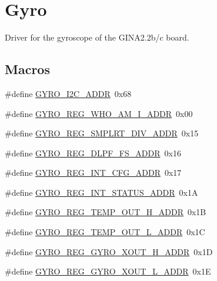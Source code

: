 \hypertarget{group___gyro}{}\section{Gyro}
\label{group___gyro}


Driver for the gyroscope of the G\+I\+N\+A2.\+2b/c board.  


\subsection*{Macros}
\begin{DoxyCompactItemize}
\item 
\#define \hyperlink{group___gyro_gad8d92e4df793131fb80295ae8ac32ebd}{G\+Y\+R\+O\+\_\+\+I2\+C\+\_\+\+A\+D\+DR}~0x68
\item 
\#define \hyperlink{group___gyro_gad4f28548805a04b3350f1812de473db9}{G\+Y\+R\+O\+\_\+\+R\+E\+G\+\_\+\+W\+H\+O\+\_\+\+A\+M\+\_\+\+I\+\_\+\+A\+D\+DR}~0x00
\item 
\#define \hyperlink{group___gyro_gae50e78b4f45f94a3d4e467f01f72fb62}{G\+Y\+R\+O\+\_\+\+R\+E\+G\+\_\+\+S\+M\+P\+L\+R\+T\+\_\+\+D\+I\+V\+\_\+\+A\+D\+DR}~0x15
\item 
\#define \hyperlink{group___gyro_gab4072c41c2a2593f97143fda49aba5ac}{G\+Y\+R\+O\+\_\+\+R\+E\+G\+\_\+\+D\+L\+P\+F\+\_\+\+F\+S\+\_\+\+A\+D\+DR}~0x16
\item 
\#define \hyperlink{group___gyro_ga670e2cfed8990ed32464824e71c69ed1}{G\+Y\+R\+O\+\_\+\+R\+E\+G\+\_\+\+I\+N\+T\+\_\+\+C\+F\+G\+\_\+\+A\+D\+DR}~0x17
\item 
\#define \hyperlink{group___gyro_ga602d94230ee7c9d4478c471378743496}{G\+Y\+R\+O\+\_\+\+R\+E\+G\+\_\+\+I\+N\+T\+\_\+\+S\+T\+A\+T\+U\+S\+\_\+\+A\+D\+DR}~0x1A
\item 
\#define \hyperlink{group___gyro_ga1fc17ed41b5e271dd8daefba9eaa76eb}{G\+Y\+R\+O\+\_\+\+R\+E\+G\+\_\+\+T\+E\+M\+P\+\_\+\+O\+U\+T\+\_\+\+H\+\_\+\+A\+D\+DR}~0x1B
\item 
\#define \hyperlink{group___gyro_ga78548502cbd224058e96cb3b6ecb018f}{G\+Y\+R\+O\+\_\+\+R\+E\+G\+\_\+\+T\+E\+M\+P\+\_\+\+O\+U\+T\+\_\+\+L\+\_\+\+A\+D\+DR}~0x1C
\item 
\#define \hyperlink{group___gyro_gac47edfa9d2921c9e5ec7f45e2ea09d31}{G\+Y\+R\+O\+\_\+\+R\+E\+G\+\_\+\+G\+Y\+R\+O\+\_\+\+X\+O\+U\+T\+\_\+\+H\+\_\+\+A\+D\+DR}~0x1D
\item 
\#define \hyperlink{group___gyro_gabaadac15da96351f956fe9774578262d}{G\+Y\+R\+O\+\_\+\+R\+E\+G\+\_\+\+G\+Y\+R\+O\+\_\+\+X\+O\+U\+T\+\_\+\+L\+\_\+\+A\+D\+DR}~0x1E

\end{DoxyCompactItemize}
